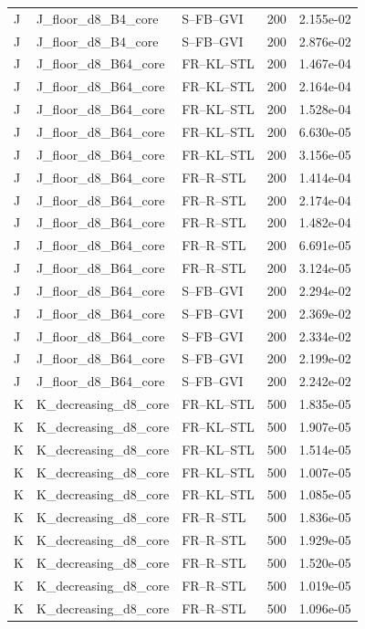 \begin{tabular}{lllrr}
J & J_floor_d8_B4_core & S--FB--GVI & 200 & 2.155e-02 \\
J & J_floor_d8_B4_core & S--FB--GVI & 200 & 2.876e-02 \\
J & J_floor_d8_B64_core & FR--KL--STL & 200 & 1.467e-04 \\
J & J_floor_d8_B64_core & FR--KL--STL & 200 & 2.164e-04 \\
J & J_floor_d8_B64_core & FR--KL--STL & 200 & 1.528e-04 \\
J & J_floor_d8_B64_core & FR--KL--STL & 200 & 6.630e-05 \\
J & J_floor_d8_B64_core & FR--KL--STL & 200 & 3.156e-05 \\
J & J_floor_d8_B64_core & FR--R--STL & 200 & 1.414e-04 \\
J & J_floor_d8_B64_core & FR--R--STL & 200 & 2.174e-04 \\
J & J_floor_d8_B64_core & FR--R--STL & 200 & 1.482e-04 \\
J & J_floor_d8_B64_core & FR--R--STL & 200 & 6.691e-05 \\
J & J_floor_d8_B64_core & FR--R--STL & 200 & 3.124e-05 \\
J & J_floor_d8_B64_core & S--FB--GVI & 200 & 2.294e-02 \\
J & J_floor_d8_B64_core & S--FB--GVI & 200 & 2.369e-02 \\
J & J_floor_d8_B64_core & S--FB--GVI & 200 & 2.334e-02 \\
J & J_floor_d8_B64_core & S--FB--GVI & 200 & 2.199e-02 \\
J & J_floor_d8_B64_core & S--FB--GVI & 200 & 2.242e-02 \\
K & K_decreasing_d8_core & FR--KL--STL & 500 & 1.835e-05 \\
K & K_decreasing_d8_core & FR--KL--STL & 500 & 1.907e-05 \\
K & K_decreasing_d8_core & FR--KL--STL & 500 & 1.514e-05 \\
K & K_decreasing_d8_core & FR--KL--STL & 500 & 1.007e-05 \\
K & K_decreasing_d8_core & FR--KL--STL & 500 & 1.085e-05 \\
K & K_decreasing_d8_core & FR--R--STL & 500 & 1.836e-05 \\
K & K_decreasing_d8_core & FR--R--STL & 500 & 1.929e-05 \\
K & K_decreasing_d8_core & FR--R--STL & 500 & 1.520e-05 \\
K & K_decreasing_d8_core & FR--R--STL & 500 & 1.019e-05 \\
K & K_decreasing_d8_core & FR--R--STL & 500 & 1.096e-05 \\

\end{tabular}
